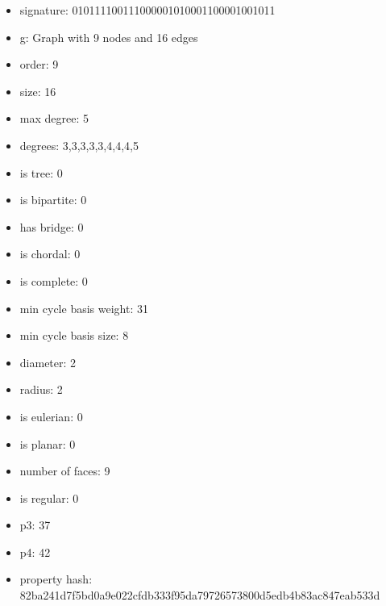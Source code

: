 \newpage
\begin{figure}
\end{figure}
\begin{itemize}
\item signature: 010111100111000001010001100001001011
\item g: Graph with 9 nodes and 16 edges
\item order: 9
\item size: 16
\item max degree: 5
\item degrees: 3,3,3,3,3,4,4,4,5
\item is tree: 0
\item is bipartite: 0
\item has bridge: 0
\item is chordal: 0
\item is complete: 0
\item min cycle basis weight: 31
\item min cycle basis size: 8
\item diameter: 2
\item radius: 2
\item is eulerian: 0
\item is planar: 0
\item number of faces: 9
\item is regular: 0
\item p3: 37
\item p4: 42
\item property hash: 82ba241d7f5bd0a9e022cfdb333f95da79726573800d5edb4b83ac847eab533d
\end{itemize}
